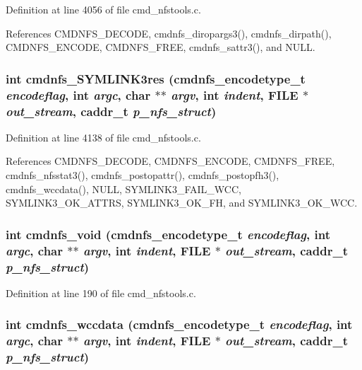 Definition at line 4056 of file cmd\_\-nfstools.c.

References CMDNFS\_\-DECODE, cmdnfs\_\-diropargs3(), cmdnfs\_\-dirpath(), CMDNFS\_\-ENCODE, CMDNFS\_\-FREE, cmdnfs\_\-sattr3(), and NULL.
\subsubsection{\setlength{\rightskip}{0pt plus 5cm}int cmdnfs\_\-SYMLINK3res ({\bf cmdnfs\_\-encodetype\_\-t} {\em encodeflag}, int {\em argc}, char $\ast$$\ast$ {\em argv}, int {\em indent}, FILE $\ast$ {\em out\_\-stream}, caddr\_\-t {\em p\_\-nfs\_\-struct})}\label{cmd__nfstools_8c_a116}




Definition at line 4138 of file cmd\_\-nfstools.c.

References CMDNFS\_\-DECODE, CMDNFS\_\-ENCODE, CMDNFS\_\-FREE, cmdnfs\_\-nfsstat3(), cmdnfs\_\-postopattr(), cmdnfs\_\-postopfh3(), cmdnfs\_\-wccdata(), NULL, SYMLINK3\_\-FAIL\_\-WCC, SYMLINK3\_\-OK\_\-ATTRS, SYMLINK3\_\-OK\_\-FH, and SYMLINK3\_\-OK\_\-WCC.
\subsubsection{\setlength{\rightskip}{0pt plus 5cm}int cmdnfs\_\-void ({\bf cmdnfs\_\-encodetype\_\-t} {\em encodeflag}, int {\em argc}, char $\ast$$\ast$ {\em argv}, int {\em indent}, FILE $\ast$ {\em out\_\-stream}, caddr\_\-t {\em p\_\-nfs\_\-struct})}\label{cmd__nfstools_8c_a59}




Definition at line 190 of file cmd\_\-nfstools.c.
\subsubsection{\setlength{\rightskip}{0pt plus 5cm}int cmdnfs\_\-wccdata ({\bf cmdnfs\_\-encodetype\_\-t} {\em encodeflag}, int {\em argc}, char $\ast$$\ast$ {\em argv}, int {\em indent}, FILE $\ast$ {\em out\_\-stream}, caddr\_\-t {\em p\_\-nfs\_\-struct})}\label{cmd__nfstools_8c_a102}




